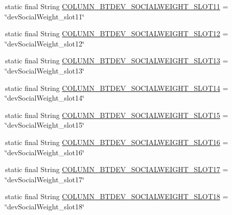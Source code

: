\begin{DoxyCompactItemize}
\item 
static final String \hyperlink{classcom_1_1social_1_1proximity_1_1_s_q_lite_helper_aa729ff0739a99c0ba71ab1494d138c67}{C\+O\+L\+U\+M\+N\+\_\+\+B\+T\+D\+E\+V\+\_\+\+S\+O\+C\+I\+A\+L\+W\+E\+I\+G\+H\+T\+\_\+\+S\+L\+O\+T11} = \char`\"{}dev\+Social\+Weight\+\_\+slot11\char`\"{}
\item 
static final String \hyperlink{classcom_1_1social_1_1proximity_1_1_s_q_lite_helper_ac8e1cb1c089ecd9de0233e4779235c66}{C\+O\+L\+U\+M\+N\+\_\+\+B\+T\+D\+E\+V\+\_\+\+S\+O\+C\+I\+A\+L\+W\+E\+I\+G\+H\+T\+\_\+\+S\+L\+O\+T12} = \char`\"{}dev\+Social\+Weight\+\_\+slot12\char`\"{}
\item 
static final String \hyperlink{classcom_1_1social_1_1proximity_1_1_s_q_lite_helper_a2d87a2fd701e0b61cadf163594a3bec1}{C\+O\+L\+U\+M\+N\+\_\+\+B\+T\+D\+E\+V\+\_\+\+S\+O\+C\+I\+A\+L\+W\+E\+I\+G\+H\+T\+\_\+\+S\+L\+O\+T13} = \char`\"{}dev\+Social\+Weight\+\_\+slot13\char`\"{}
\item 
static final String \hyperlink{classcom_1_1social_1_1proximity_1_1_s_q_lite_helper_a3e7b695f8efbfc00b21504aa02d7d59f}{C\+O\+L\+U\+M\+N\+\_\+\+B\+T\+D\+E\+V\+\_\+\+S\+O\+C\+I\+A\+L\+W\+E\+I\+G\+H\+T\+\_\+\+S\+L\+O\+T14} = \char`\"{}dev\+Social\+Weight\+\_\+slot14\char`\"{}
\item 
static final String \hyperlink{classcom_1_1social_1_1proximity_1_1_s_q_lite_helper_ad0a80f64e98863ff57a4cf8f9a113766}{C\+O\+L\+U\+M\+N\+\_\+\+B\+T\+D\+E\+V\+\_\+\+S\+O\+C\+I\+A\+L\+W\+E\+I\+G\+H\+T\+\_\+\+S\+L\+O\+T15} = \char`\"{}dev\+Social\+Weight\+\_\+slot15\char`\"{}
\item 
static final String \hyperlink{classcom_1_1social_1_1proximity_1_1_s_q_lite_helper_aca5c6c9e141b90bd7e730c65f93849a0}{C\+O\+L\+U\+M\+N\+\_\+\+B\+T\+D\+E\+V\+\_\+\+S\+O\+C\+I\+A\+L\+W\+E\+I\+G\+H\+T\+\_\+\+S\+L\+O\+T16} = \char`\"{}dev\+Social\+Weight\+\_\+slot16\char`\"{}
\item 
static final String \hyperlink{classcom_1_1social_1_1proximity_1_1_s_q_lite_helper_a444273fa0ffa682c5b0d789d1e91725a}{C\+O\+L\+U\+M\+N\+\_\+\+B\+T\+D\+E\+V\+\_\+\+S\+O\+C\+I\+A\+L\+W\+E\+I\+G\+H\+T\+\_\+\+S\+L\+O\+T17} = \char`\"{}dev\+Social\+Weight\+\_\+slot17\char`\"{}
\item 
static final String \hyperlink{classcom_1_1social_1_1proximity_1_1_s_q_lite_helper_a7440b69bf721bc1699d3f9b44760bb8a}{C\+O\+L\+U\+M\+N\+\_\+\+B\+T\+D\+E\+V\+\_\+\+S\+O\+C\+I\+A\+L\+W\+E\+I\+G\+H\+T\+\_\+\+S\+L\+O\+T18} = \char`\"{}dev\+Social\+Weight\+\_\+slot18\char`\"{}
\item 

\end{DoxyCompactItemize}
